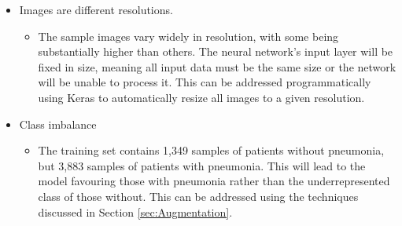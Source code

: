 \documentclass[12pt]{report}
\begin{document}
\begin{itemize}
    \item Images are different resolutions.
    \begin{itemize}
        \item The sample images vary widely in resolution, with some being substantially higher than others.
        The neural network's input layer will be fixed in size, meaning all input data must be the 
        same size or the network will be unable to process it. This can be addressed programmatically using Keras to automatically resize 
        all images to a given resolution.
    \end{itemize}
    \item Class imbalance
    \begin{itemize}
        \item The training set contains 1,349 samples of patients without pneumonia, but 3,883 samples of patients with pneumonia.
        This will lead to the model favouring those with pneumonia rather than the underrepresented class of those without. This can be addressed 
        using the techniques discussed in Section \ref{sec:Augmentation}.
    \end{itemize}
\end{itemize}



\end{document}
